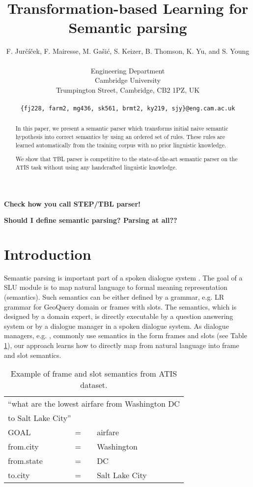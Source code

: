 \documentclass[11pt]{article}
\title{Transformation-based Learning for Semantic parsing}
\author{F. Jur\v{c}\'{i}\v{c}ek, F. Mairesse, M. Ga\v{s}i\'{c}, S. Keizer, B. Thomson, K. Yu, and S. Young \\
\\
Engineering Department \\
Cambridge University \\
Trumpington Street, Cambridge, CB2 1PZ, UK \\
\\
{\tt \{fj228, farm2, mg436, sk561, brmt2, ky219, sjy\}@eng.cam.ac.uk}
}
\date{}
\begin{document}
\maketitle
\begin{abstract}
In this paper, we present a semantic parser which transforms initial naive semantic hypothesis into correct semantics by using an ordered set of rules. These rules are learned automatically from the training corpus with no prior linguistic knowledge.

We show that TBL parser is competitive to the state-of-the-art semantic parser on the ATIS task without using any handcrafted linguistic knowledge.

\end{abstract}

\textbf{Check how you call STEP/TBL parser!}

\textbf{Should I define semantic parsing? Parsing at all??}

\section{Introduction}
Semantic parsing is important part of a spoken dialogue system \cite{williams07}. The goal of a SLU module is to map natural language to formal meaning representation (semantics). Such semantics can be either defined by a grammar, e.g. LR grammar for GeoQuery domain \cite{kate05} or frames with slots. The semantics, which is designed by a domain expert, is directly executable by a question answering system \cite{wong06} or by a dialogue manager in a spoken dialogue system. As dialogue managers, e.g. \cite{thomson08}, commonly use semantics in the form frames and slots (see Table \ref{tbl:sem:example}), our approach learns how to directly map from natural language into frame and slot semantics.

\begin{table}
\begin{center}
\begin{tabular}{|lll|} 
  \hline
  \multicolumn{3}{l}{``what are the lowest airfare from Washington DC} \\
  \multicolumn{3}{l}{to Salt Lake City''} \\
  \hline
  GOAL          & = & airfare \\
  from.city     & = & Washington \\
  from.state    & = & DC \\
  to.city       & = & Salt Lake City \\
  \hline
\end{tabular} 
\end{center}
\caption{Example of frame and slot semantics from ATIS \cite{atis94} dataset.}
\label{tbl:sem:example}
\end{table}
\end{document}
